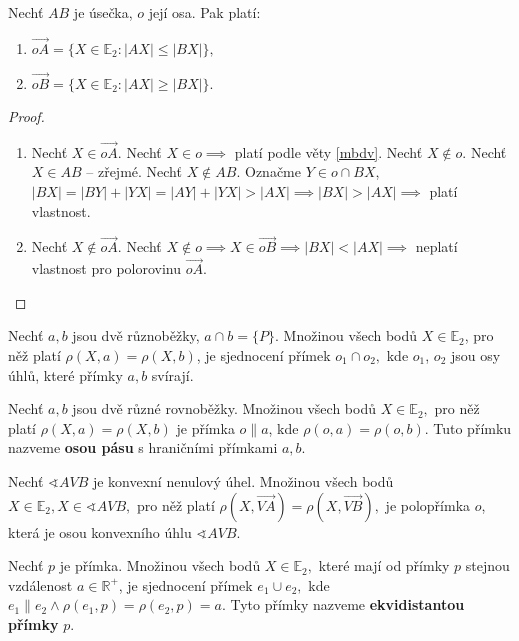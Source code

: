 \begin{veta}
  Nechť $AB$ je úsečka, $o$ její osa. Pak platí:
  \begin{enumerate}[$i.$]
    \item $\overrightarrow{oA}=\{ X\in \mathbb E_2:|AX|\leq |BX| \},$
    \item $\overrightarrow{oB}=\{ X \in \mathbb E_2 : |AX| \geq |BX| \}.$
  \end{enumerate}
\end{veta}

\begin{proof}
  \begin{enumerate}[$i.$]
    \item Nechť $X\in \overrightarrow{oA}$. Nechť $X\in o\implies$ platí podle věty \ref{mbdv}. Nechť $X\notin o$. Nechť $X\in AB$ -- zřejmé. Nechť $X\notin AB$. Označme $Y\in o \cap BX$, $|BX|=|BY|+|YX|=|AY|+|YX|>|AX|\implies |BX|>|AX|\implies$ platí vlastnost.
    \item Nechť $X\notin \overrightarrow{oA}$. Nechť $X\notin o \implies X\in \overrightarrow{oB}\implies |BX|<|AX|\implies$ neplatí vlastnost pro polorovinu $\overrightarrow{oA}.$ \qedhere
\end{enumerate}
\end{proof}

\begin{veta}
  Nechť $a,b$ jsou dvě různoběžky, $a\cap b = \{P\}.$ Množinou všech bodů $X\in \mathbb E_2$, pro něž platí $\rho(X,a)=\rho(X,b)$, je sjednocení přímek $o_1\cap o_2,$ kde  $o_1$, $o_2$ jsou osy úhlů, které přímky $a,b$ svírají.
\end{veta}


\begin{definition}
  Nechť $a,b$ jsou dvě různé rovnoběžky. Množinou všech bodů $X\in \mathbb E_2,$ pro něž platí $\rho(X,a)=\rho(X,b)$ je přímka $o\parallel a$, kde $\rho(o,a)=\rho(o,b)$. Tuto přímku nazveme \textbf{osou pásu} s hraničními přímkami $a,b$.
\end{definition}

\begin{veta}
  Nechť $\sphericalangle AVB$ je konvexní nenulový úhel. Množinou všech bodů $X\in \mathbb E_2, X\in \sphericalangle AVB,$ pro něž platí $\rho(X, \overrightarrow{VA})=\rho(X,\overrightarrow{VB}),$ je polopřímka $o$, která je osou konvexního úhlu $\sphericalangle AVB.$
\end{veta}

\begin{definition}
  Nechť $p$ je přímka. Množinou všech bodů $X \in \mathbb E_2,$ které mají od přímky $p$ stejnou vzdálenost $a\in \mathbb R^+$, je sjednocení přímek $e_1\cup e_2,$ kde $e_1 \parallel e_2 \land \rho(e_1,p)=\rho(e_2,p)=a$. Tyto přímky nazveme
  \textbf{ekvidistantou přímky} $p$.
\end{definition}

